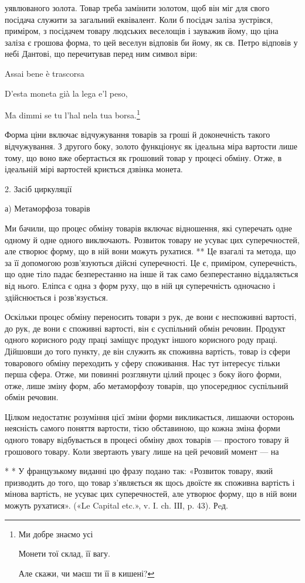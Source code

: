 \parcont{}  %
уявлюваного золота. Товар треба замінити золотом, щоб він міг
для свого посідача служити за загальний еквівалент. Коли б
посідач заліза зустрівся, приміром, з посідачем товару людських
веселощів і зауважив йому, що ціна заліза є грошова форма,
то цей веселун відповів би йому, як св. Петро відповів у небі
Дантові, що перечитував перед ним символ віри:

Assai bene è trascorsa

D’esta moneta già la lega e’l peso,

Ma dimmi se tu l’hal nela tua borsa.\footnote*{
Ми добре знаємо усі

Монети тої склад, її вагу.

Але скажи, чи маєш ти її в кишені?
}

Форма ціни включає відчужування товарів за гроші й доконечність
такого відчужування. З другого боку, золото функціонує
як ідеальна міра вартости лише тому, що воно вже обертається
як грошовий товар у процесі обміну. Отже, в ідеальній
мірі вартостей криється дзвінка монета.

2. Засіб циркуляції

а) Метаморфоза товарів

Ми бачили, що процес обміну товарів включає відношення,
які суперечать одне одному й одне одного виключають. Розвиток
товару не усуває цих суперечностей, але створює форму, що в
ній вони можуть рухатися. ** Це взагалі та метода, що за її допомогою
розв’язуються дійсні суперечності. Це є, приміром, суперечність,
що одне тіло падає безперестанно на інше й так само безперестанно
віддаляється від нього. Еліпса є одна з форм руху,
що в ній ця суперечність одночасно і здійснюється і розв’язується.

Оскільки процес обміну переносить товари з рук, де вони є
неспоживні вартості, до рук, де вони є споживні вартості, він
є суспільний обмін речовин. Продукт одного корисного роду
праці заміщує продукт іншого корисного роду праці. Дійшовши
до того пункту, де він служить як споживна вартість, товар
із сфери товарового обміну переходить у сферу споживання.
Нас тут інтересує тільки перша сфера. Отже, ми повинні розглянути
цілий процес з боку його форми, отже, лише зміну форм,
або метаморфозу товарів, що упосереднює суспільний обмін
речовин.

Цілком недостатнє розуміння цієї зміни форми викликається,
лишаючи осторонь неясність самого поняття вартости, тією обставиною,
що кожна зміна форми одного товару відбувається в
процесі обміну двох товарів — простого товару й грошового
товару. Коли звертають увагу лише на цей речовий момент — на

* * У французькому виданні цю фразу подано так: «Розвиток товару,
який призводить до того, що товар з’являється як щось двоїсте як споживна
вартість і мінова вартість, не усуває цих суперечностей, але утворює
форму, що в ній вони можуть рухатися». («Le Capital etc.», v. I. ch. IІІ,
p. 43). Рeд.
\parbreak{}  %
